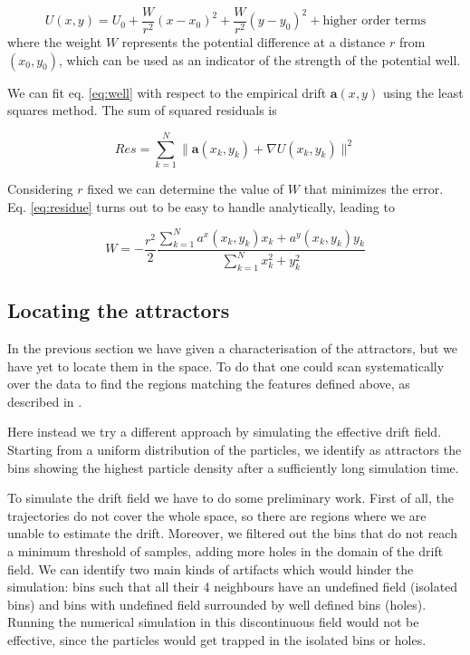 \documentclass[14pt,a4paper]{article}
\begin{document}
\begin{equation} \label{eq:well}
U(x, y) = U_0 + \frac{W}{r^2}\left(x - x_0\right)^2 + \frac{W}{r^2}\left(y - y_0\right)^2 + \text{higher order terms}
\end{equation}
where the weight $W$ represents the potential difference at a distance $r$ from $(x_0, y_0)$, which can be used as an indicator of the strength of the potential well.

We can fit eq. \ref{eq:well} with respect to the empirical drift $\bm{a}(x, y)$ using the least squares method. The sum of squared residuals is

\begin{equation} \label{eq:residue}
Res = \sum_{k = 1}^N \| \bm{a}(x_k, y_k) + \nabla U(x_k, y_k) \|^2
\end{equation}

Considering $r$ fixed we can determine the value of $W$ that minimizes the error. Eq. \ref{eq:residue} turns out to be easy to handle analytically, leading to

\begin{equation}
W = - \frac{r^2}{2} \frac{\sum_{k = 1}^N a^x(x_k, y_k) x_k + a^y(x_k, y_k) y_k}{\sum_{k = 1}^N x_k^2 + y_k^2}
\end{equation}

\subsection{Locating the attractors}

In the previous section we have given a characterisation of the attractors, but we have yet to locate them in the space. To do that one could scan systematically over the data to find the regions matching the features defined above, as described in \cite{hoze2012}.

Here instead we try a different approach by simulating the effective drift field. Starting from a uniform distribution of the particles, we identify as attractors the bins showing the highest particle density after a sufficiently long simulation time.

To simulate the drift field we have to do some preliminary work. First of all, the trajectories do not cover the whole space, so there are regions where we are unable to estimate the drift. Moreover, we filtered out the bins that do not reach a minimum threshold of samples, adding more holes in the domain of the drift field.
We can identify two main kinds of artifacts which would hinder the simulation: bins such that all their 4 neighbours have an undefined field (isolated bins) and bins with undefined field surrounded by well defined bins (holes). Running the numerical simulation in this discontinuous field would not be effective, since the particles would get trapped in the isolated bins or holes.
\end{document}
